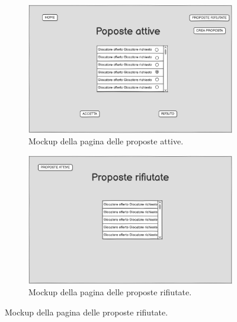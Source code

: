 \begin{figure}[H]
    \centering

    \begin{subfigure}[b]{0.49\textwidth}
        \centering
        \includegraphics[width=\textwidth]{Resources/Mockups/ProposteAttive.png}
        \caption{Mockup della pagina delle proposte attive.}
        \label{fig:pagina_proposte_attive}
    \end{subfigure}
    \hfill
    \begin{subfigure}[b]{0.49\textwidth}
        \centering
        \includegraphics[width=\textwidth]{Resources/Mockups/ProposteRifiutate.png}
        \caption{Mockup della pagina delle proposte rifiutate.}
        \label{fig:pagina_proposte_rifiutate}
    \end{subfigure}


\end{figure}
